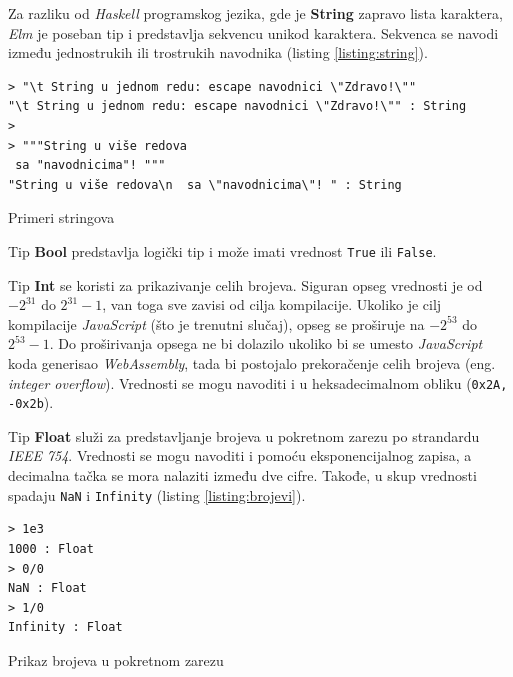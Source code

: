 \documentclass[12pt,oneside]{memoir}
\begin{document}
Za razliku od \emph{Haskell} programskog jezika, gde je \textbf{String} zapravo lista karaktera, \emph{Elm} je
poseban tip i predstavlja sekvencu unikod karaktera. Sekvenca se navodi između
jednostrukih ili trostrukih navodnika (listing \ref{listing:string}).

\begin{listing}[ht]
\begin{verbatim}
> "\t String u jednom redu: escape navodnici \"Zdravo!\""
"\t String u jednom redu: escape navodnici \"Zdravo!\"" : String
>
> """String u više redova
 sa "navodnicima"! """
"String u više redova\n  sa \"navodnicima\"! " : String
\end{verbatim}
\caption{Primeri stringova}
\label{listing:string}
\end{listing}

Tip \textbf{Bool} predstavlja logički tip i može imati vrednost \texttt{True} ili
\texttt{False}. 

Tip \textbf{Int} se koristi za prikazivanje celih brojeva. Siguran opseg vrednosti je
od \(-2^{31}\) do \(2^{31} - 1\), van toga sve zavisi od cilja kompilacije. Ukoliko je
cilj kompilacije \emph{JavaScript} (što je trenutni slučaj), opseg se proširuje na \(-2^{53}\) do
\(2^{53} - 1\). Do proširivanja opsega ne bi dolazilo ukoliko bi se
umesto \emph{JavaScript} koda generisao \emph{WebAssembly}, tada bi postojalo prekoračenje celih
brojeva (eng. \emph{integer overflow}). Vrednosti se mogu navoditi i u heksadecimalnom
obliku (\texttt{0x2A, -0x2b}).

Tip \textbf{Float} služi za predstavljanje brojeva u pokretnom zarezu po strandardu
\emph{IEEE 754}. Vrednosti se mogu navoditi i pomoću eksponencijalnog zapisa, a decimalna 
tačka se mora nalaziti između dve cifre. Takođe, u skup vrednosti spadaju \texttt{NaN} i
\texttt{Infinity} (listing \ref{listing:brojevi}).

\begin{listing}[ht]
\begin{verbatim}
> 1e3
1000 : Float
> 0/0 
NaN : Float
> 1/0 
Infinity : Float
\end{verbatim}
\caption{Prikaz brojeva u pokretnom zarezu}
\label{listing:brojevi}
\end{listing}
\end{document}
